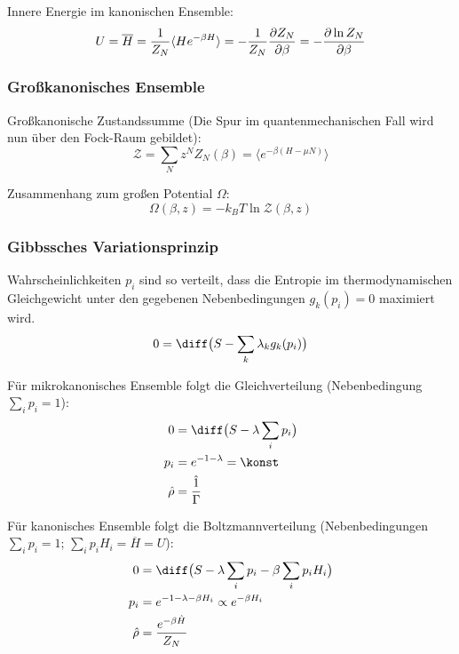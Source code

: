 \documentclass[11pt]{article}
\numberwithin{equation}{section}
\begin{document}
				\noindent
				Innere Energie im kanonischen Ensemble:
				\begin{equation}
					U = \overline{H} = \frac{1}{Z_N}\langle He^{-\beta H}\rangle = -\frac{1}{Z_N}\frac{\partial Z_N}{\partial \beta} = -\frac{\partial \ln Z_N}{\partial \beta}
				\end{equation}

			\subsubsection{Großkanonisches Ensemble}
				\noindent
				Großkanonische Zustandssumme (Die Spur im quantenmechanischen Fall wird nun über den Fock-Raum gebildet):
				\begin{equation}
					\mathcal{Z} = \sum_N z^N Z_N(\beta) = \langle e^{-\beta(H-\mu N)} \rangle
				\end{equation}

				\noindent
				Zusammenhang zum großen Potential $\Omega$:
				\begin{equation}
					\Omega(\beta,z) = -k_B T \ln \mathcal{Z}(\beta,z)
				\end{equation}


			\subsubsection{Gibbssches Variationsprinzip}
				\noindent
				Wahrscheinlichkeiten $p_i$ sind so verteilt, dass die Entropie im thermodynamischen Gleichgewicht unter den gegebenen Nebenbedingungen $g_k(p_i) = 0$ maximiert wird.
				\begin{equation}
					0 = \diff \big( S - \sum_k \lambda_k g_k(p_i) \big)
				\end{equation}

				\noindent
				Für mikrokanonisches Ensemble folgt die Gleichverteilung (Nebenbedingung $\sum_i p_i = 1$):
				\begin{equation}
					\begin{aligned}
						0 &= \diff \big( S - \lambda \sum_i p_i \big) \\
						p_i &= e^{-1-\lambda} = \konst \\
						\hat{\rho} &= \frac{\hat{1}}{\Gamma} \\ %
					\end{aligned}
				\end{equation}

				\noindent
				Für kanonisches Ensemble folgt die Boltzmannverteilung (Nebenbedingungen $\sum_i p_i = 1$; $\sum_i p_i H_i = \overline{H} = U$):
				\begin{equation}
					\begin{aligned}
						0 &= \diff \big( S - \lambda \sum_i p_i - \beta \sum_i p_i H_i \big) \\
						p_i &= e^{-1-\lambda-\beta H_i} \propto e^{-\beta H_i} \\
						\hat{\rho} &= \frac{e^{-\beta \hat{H}}}{Z_N} \\
					\end{aligned}
				\end{equation}
\end{document}
